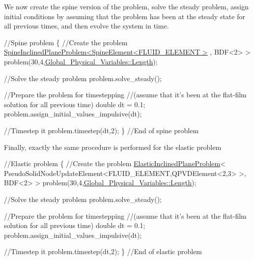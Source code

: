 We now create the spine version of the problem, solve the steady problem, assign initial conditions by assuming that the problem has been at the steady state for all previous times, and then evolve the system in time. 
\begin{DoxyCodeInclude}
 \textcolor{comment}{//Spine problem}
 \{
  \textcolor{comment}{//Create the problem}
  \hyperlink{classSpineInclinedPlaneProblem}{SpineInclinedPlaneProblem<SpineElement<FLUID\_ELEMENT >}
      , BDF<2> > 
   problem(30,4,\hyperlink{namespaceGlobal__Physical__Variables_a987847160c3cfad8977836291fb9d0e0}{Global\_Physical\_Variables::Length});
  
  \textcolor{comment}{//Solve the steady problem}
  problem.solve\_steady();
  
  \textcolor{comment}{//Prepare the problem for timestepping }
  \textcolor{comment}{//(assume that it's been at the flat-film solution for all previous time)}
  \textcolor{keywordtype}{double} dt = 0.1;
  problem.assign\_initial\_values\_impulsive(dt);
  
  \textcolor{comment}{//Timestep it }
  problem.timestep(dt,2);
 \} \textcolor{comment}{//End of spine problem}

\end{DoxyCodeInclude}
 Finally, exactly the same procedure is performed for the elastic problem 
\begin{DoxyCodeInclude}
 \textcolor{comment}{//Elastic problem}
 \{
  \textcolor{comment}{//Create the problem}
  \hyperlink{classElasticInclinedPlaneProblem}{ElasticInclinedPlaneProblem}<
   PseudoSolidNodeUpdateElement<FLUID\_ELEMENT,QPVDElement<2,3> >, BDF<2> > 
     problem(30,4,\hyperlink{namespaceGlobal__Physical__Variables_a987847160c3cfad8977836291fb9d0e0}{Global\_Physical\_Variables::Length});
  
  \textcolor{comment}{//Solve the steady problem}
  problem.solve\_steady();
  
  \textcolor{comment}{//Prepare the problem for timestepping }
  \textcolor{comment}{//(assume that it's been at the flat-film solution for all previous time)}
  \textcolor{keywordtype}{double} dt = 0.1;
  problem.assign\_initial\_values\_impulsive(dt);

  \textcolor{comment}{//Timestep it}
  problem.timestep(dt,2);
 \} \textcolor{comment}{//End of elastic problem}

\end{DoxyCodeInclude}




